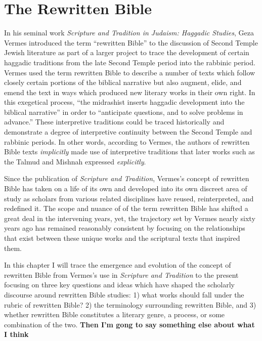 \chapter{The Rewritten Bible}\label{the-rwb}

In his seminal work
\emph{Scripture and Tradition in Judaism: Haggadic Studies}, Geza Vermes
introduced the term ``rewritten Bible'' to the discussion of
Second Temple Jewish literature as part of a larger project to trace the
development of certain haggadic traditions from the late Second Temple
period into the rabbinic period. Vermes used the term rewritten Bible to
describe a number of texts which follow closely certain portions of the
biblical narrative but also augment, elide, and emend the text in ways
which produced new literary works in their own right. In this exegetical
process, ``the midrashist inserts haggadic development into the biblical
narrative'' in order to ``anticipate questions, and to solve problems in
advance.''\autocites[95]{vermes1961}[see also][]{vermes_zsengeller2014}
These interpretive traditions could be traced historically and
demonstrate a degree of interpretive continuity between the
Second Temple and rabbinic periods. In other words, according to Vermes,
the authors of rewritten Bible texts \emph{implicitly} made use of
interpretive traditions that later works such as the Talmud and Mishnah
expressed \emph{explicitly}.

Since the publication of \emph{Scripture and Tradition}, Vermes's
concept of rewritten Bible has taken on a life of its own and developed
into its own discreet area of study as scholars from various related
disciplines have reused, reinterpreted, and redefined it. The scope and
nuance of of the term rewritten Bible has shifted a great deal in the
intervening years, yet, the trajectory set by Vermes nearly sixty years
ago has remained reasonably consistent by focusing on the relationships
that exist between these unique works and the scriptural texts that
inspired them.

In this chapter I will trace the emergence and evolution of the concept
of rewritten Bible from Vermes's use in \emph{Scripture and Tradition}
to the present focusing on three key questions and ideas which have
shaped the scholarly discourse around rewritten Bible studies: 1) what
works should fall under the rubric of rewritten Bible? 2) the
terminology surrounding rewritten Bible, and 3) whether rewritten Bible
constitutes a literary genre, a process, or some combination of the two.
\textbf{Then I'm gong to say something else about what I think}

